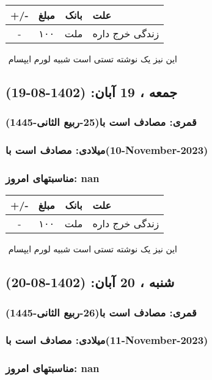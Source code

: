 \documentclass{article}
\newcommand{\rnote}[1]{\marginpar{\textcolor{color}{\StrSubstitute{\##1}{ }{\_}}}}
\newcommand{\myRow}[4]{
    #1 & #2 & #3 & #4 \\ \hline
}
\begin{document}
\begin{tabular}{ | c | c | c | p{5cm} |}
    \hline
    \myRow{ +/- }{مبلغ}{بانک}{علت}
    \myRow{-}{۱۰۰}{ملت}{زندگی خرج داره}
\end{tabular}
\newline
\newline

‌
\rnote{تست}
این نیز یک نوشته تستی است شبیه لورم ایپسام




\newpage
{}
\textcolor{color}{
\section{ جمعه ، 19 آبان: (1402-08-19) }
\subsubsection*{قمری: مصادف است با(25-ربیع الثانی-1445)} 
\subsubsection*{میلادی: مصادف است با(10-November-2023)}
\subsubsection*{مناسبتهای امروز: nan}
}


\begin{tabular}{ | c | c | c | p{5cm} |}
    \hline
    \myRow{ +/- }{مبلغ}{بانک}{علت}
    \myRow{-}{۱۰۰}{ملت}{زندگی خرج داره}
\end{tabular}
\newline
\newline

‌
\rnote{تست}
این نیز یک نوشته تستی است شبیه لورم ایپسام




\newpage
{}
\textcolor{color}{
\section{ شنبه ، 20 آبان: (1402-08-20) }
\subsubsection*{قمری: مصادف است با(26-ربیع الثانی-1445)} 
\subsubsection*{میلادی: مصادف است با(11-November-2023)}
\subsubsection*{مناسبتهای امروز: nan}
}
\end{document}
